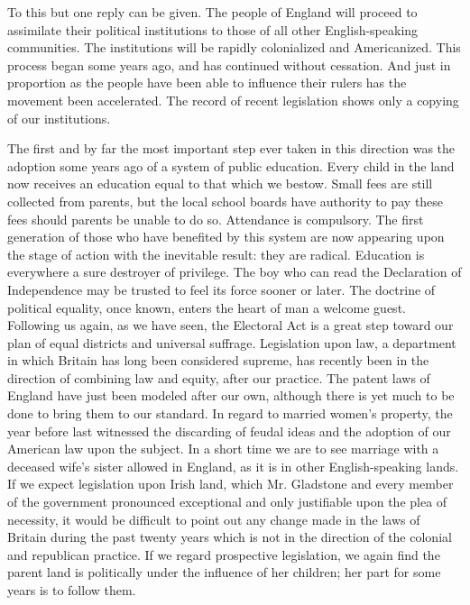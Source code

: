 \documentclass[11pt,openany]{book}
\begin{document}
To this but one reply can be given. The people of England will proceed to assimilate their political institutions to those of all other English-speaking communities. The institutions will be rapidly colonialized and Americanized. This process began some years ago, and has continued without cessation. And just in proportion as the people have been able to influence their rulers has the movement been accelerated. The record of recent legislation shows only a copying of our institutions.

The first and by far the most important step ever taken in this direction was the adoption some years ago of a system of public education. Every child in the land now receives an education equal to that which we bestow. Small fees are still collected from parents, but the local school boards have authority to pay these fees should parents be unable to do so. Attendance is compulsory. The first generation of those who have benefited by this system are now appearing upon the stage of action with the inevitable result: they are radical. Education is everywhere a sure destroyer of privilege. The boy who can read the Declaration of Independence may be trusted to feel its force sooner or later. The doctrine of political equality, once known, enters the heart of man a welcome guest. Following us again, as we have seen, the Electoral Act is a great step toward our plan of equal districts and universal suffrage. Legislation upon law, a department in which Britain has long been considered supreme, has recently been in the direction of combining law and equity, after our practice. The patent laws of England have just been modeled after our own, although there is yet much to be done to bring them to our standard. In regard to married women's property, the year before last witnessed the discarding of feudal ideas and the adoption of our American law upon the subject. In a short time we are to see marriage with a deceased wife's sister allowed in England, as it is in other English-speaking lands. If we expect legislation upon Irish land, which Mr. Gladstone and every member of the government pronounced exceptional and only justifiable upon the plea of necessity, it would be difficult to point out any change made in the laws of Britain during the past twenty years which is not in the direction of the colonial and republican practice. If we regard prospective legislation, we again find the parent land is politically under the influence of her children; her part for some years is to follow them.
\end{document}

